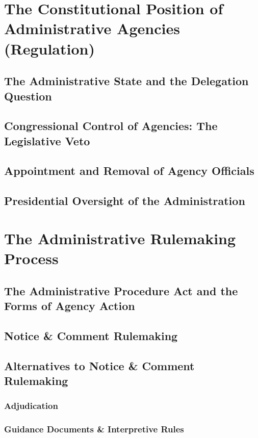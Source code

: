 \documentclass[11pt]{tex/lawoutline}
\begin{document}
\chapter{The Constitutional Position of Administrative Agencies (Regulation)}

\section{The Administrative State and the Delegation Question}

\section{Congressional Control of Agencies: The Legislative Veto}

\section{Appointment and Removal of Agency Officials} 

\section{Presidential Oversight of the Administration}

\chapter{The Administrative Rulemaking Process} 

\section{The Administrative Procedure Act and the Forms of Agency Action} 

\section{Notice \& Comment Rulemaking} 

\section{Alternatives to Notice \& Comment Rulemaking}

\subsection{Adjudication}

\subsection{Guidance Documents \& Interpretive Rules}
\end{document}
